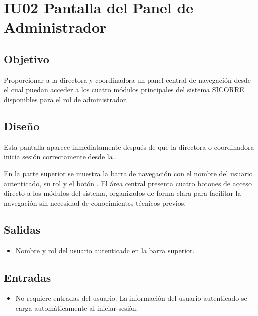 \section{IU02 Pantalla del Panel de Administrador}

\subsection{Objetivo}
Proporcionar a la directora y coordinadora un panel central de navegación 
desde el cual puedan acceder a los cuatro módulos principales del sistema 
SICORRE disponibles para el rol de administrador.

\subsection{Diseño}
Esta pantalla  aparece 
inmediatamente después de que la directora o coordinadora inicia sesión 
correctamente desde la . 

En la parte superior se muestra la barra de navegación con el nombre del 
usuario autenticado, su rol y el botón . El área 
central presenta cuatro botones de acceso directo a los módulos del sistema, 
organizados de forma clara para facilitar la navegación sin necesidad de 
conocimientos técnicos previos.


\subsection{Salidas}
\begin{itemize}
	\item Nombre y rol del usuario autenticado en la barra superior.
\end{itemize}

\subsection{Entradas}
\begin{itemize}
	\item No requiere entradas del usuario. La información del usuario 
	autenticado se carga automáticamente al iniciar sesión.
\end{itemize}

